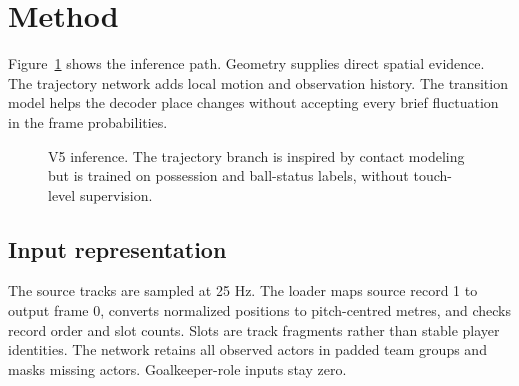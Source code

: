 \documentclass[11pt,a4paper]{article}
\begin{document}
\section{Method}
Figure~\ref{fig:pipeline} shows the inference path. Geometry supplies direct spatial
evidence. The trajectory network adds local motion and observation history. The
transition model helps the decoder place changes without accepting every brief
fluctuation in the frame probabilities.

\begin{figure}[ht]
\centering
{}
\caption{V5 inference. The trajectory branch is inspired by contact modeling but
is trained on possession and ball-status labels, without touch-level supervision.}
\label{fig:pipeline}
\end{figure}

\subsection{Input representation}
The source tracks are sampled at 25 Hz. The loader maps source record 1 to output frame 0, converts normalized positions
to pitch-centred metres, and checks record order and slot counts. Slots are
track fragments rather than stable player identities. The network retains all
observed actors in padded team groups and masks missing actors. Goalkeeper-role
inputs stay zero.
\end{document}
